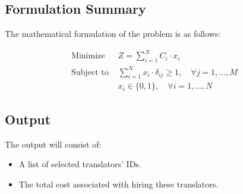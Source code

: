 \documentclass{article}
\begin{document}
\subsection*{Formulation Summary}
The mathematical formulation of the problem is as follows:

\begin{align*}
\text{Minimize } & Z = \sum_{i=1}^{N} C_i \cdot x_i \\
\text{Subject to } & \sum_{i=1}^{N} x_i \cdot \delta_{ij} \geq 1, \quad \forall j = 1, \ldots, M \\
& x_i \in \{0, 1\}, \quad \forall i = 1, \ldots, N
\end{align*}

\subsection*{Output}
The output will consist of:
\begin{itemize}
    \item A list of selected translators' IDs.
    \item The total cost associated with hiring these translators.
\end{itemize}
\end{document}
